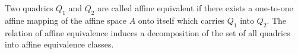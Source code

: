 Two quadrics $Q_1$ and $Q_2$ are called affine equivalent if there exists a one-to-one affine mapping of the affine space $A$ onto itself which carries $Q_1$ into $Q_2$. The relation of affine equivalence induces a decomposition of the set of all quadrics into affine equivalence classes.
